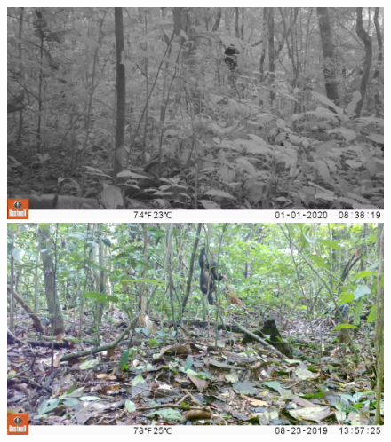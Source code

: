 \begin{figure}[htbp]
    \begin{minipage}[t]{0.48\textwidth}
        \centering
        \includegraphics[width=\linewidth]{body/experimental/assets/detection_frames/frame5}
    \end{minipage}
    \begin{minipage}[t]{0.48\textwidth}
        \centering
        \includegraphics[width=\linewidth]{body/experimental/assets/detection_frames/frame6}
    \end{minipage}


\end{figure}
